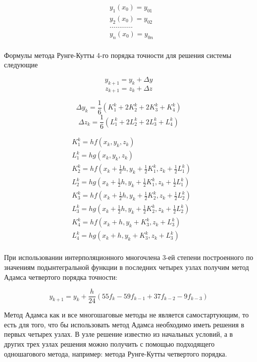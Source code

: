 $$\begin{aligned}
    & y_1(x_0) = y_{01} \\ 
    & y_2(x_0) = y_{02} \\ 
    & \dots\dots\dots\dots \\ 
    & y_n(x_0) = y_{0n} \\ 
\end{aligned}$$

Формулы метода Рунге-Кутты 4-го порядка точности для решения системы
следующие

$$y_{k+1} = y_k + \Delta y$$
$$z_{k+1} = z_k + \Delta z$$

$$\Delta y_k = \frac{1}{6}(K_1^k + 2K_2^k + 2K_3^k + K_4^k)$$
$$\Delta z_k = \frac{1}{6}(L_1^k + 2L_2^k + 2L_3^k + L_4^k)$$

$$\begin{aligned}
    & K_1^k = hf\left(x_k, y_k, z_k\right) \\
    & L_1^k = hg\left(x_k, y_k, z_k\right) \\
    & K_2^k = hf\left(x_k + \frac{1}{2}h, y_k + \frac{1}{2}K_1^k, z_k + \frac{1}{2}L_1^k \right) \\
    & L_2^k = hg\left(x_k + \frac{1}{2}h, y_k + \frac{1}{2}K_1^k, z_k + \frac{1}{2}L_1^k \right) \\
    & K_3^k = hf\left(x_k + \frac{1}{2}h, y_k + \frac{1}{2}K_2^k, z_k + \frac{1}{2}L_2^k \right) \\
    & L_3^k = hg\left(x_k + \frac{1}{2}h, y_k + \frac{1}{2}K_2^k, z_k + \frac{1}{2}L_2^k \right) \\
    & K_4^k = hf\left(x_k + h, y_k + K_3^k, z_k + L_3^k\right) \\
    & L_4^k = hg\left(x_k + h, y_k + K_3^k, z_k + L_3^k\right) \\
\end{aligned}$$

При использовании интерполяционного многочлена 3-ей степени построенного
по значениям подынтегральной функции в последних четырех узлах получим
метод Адамса четвертого порядка точности:

$$y_{k+1} = y_k + \frac{h}{24}\left(55f_k - 59f_{k-1}+37f_{k-2}
-9f_{k-3}\right)$$

Метод Адамса как и все многошаговые методы не является самостартующим,
то есть для того, что бы использовать метод Адамса необходимо иметь
решения в первых четырех узлах. В узле решение известно из начальных
условий, а в других трех узлах решения можно получить с помощью
подходящего одношагового метода, например: метода Рунге-Кутты четвертого
порядка.













\pagebreak